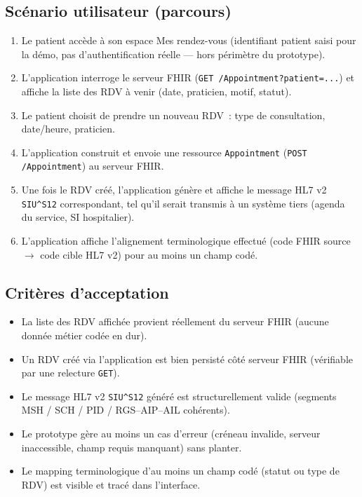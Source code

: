 \documentclass[11pt,a4paper]{article}
\newcommand{\siu}{SIU\textasciicircum{}S12}
\begin{document}
\subsection{Sc\'enario utilisateur (parcours)}
\begin{enumerate}[leftmargin=1.2cm]
  \item Le patient acc\`ede \`a son espace \og Mes rendez-vous \fg{} (identifiant patient saisi pour la d\'emo, pas d'authentification r\'eelle --- hors p\'erim\`etre du prototype).
  \item L'application interroge le serveur FHIR (\texttt{GET /Appointment?patient=...}) et affiche la liste des RDV \`a venir (date, praticien, motif, statut).
  \item Le patient choisit de prendre un nouveau RDV~: type de consultation, date/heure, praticien.
  \item L'application construit et envoie une ressource \texttt{Appointment} (\texttt{POST /Appointment}) au serveur FHIR.
  \item Une fois le RDV cr\'e\'e, l'application g\'en\`ere et affiche le message HL7 v2 \texttt{\siu} correspondant, tel qu'il serait transmis \`a un syst\`eme tiers (agenda du service, SI hospitalier).
  \item L'application affiche l'alignement terminologique effectu\'e (code FHIR source $\rightarrow$ code cible HL7 v2) pour au moins un champ cod\'e.
\end{enumerate}

\subsection{Crit\`eres d'acceptation}
\begin{itemize}[leftmargin=1.2cm]
  \item La liste des RDV affich\'ee provient r\'eellement du serveur FHIR (aucune donn\'ee m\'etier cod\'ee en dur).
  \item Un RDV cr\'e\'e via l'application est bien persist\'e c\^ot\'e serveur FHIR (v\'erifiable par une relecture \texttt{GET}).
  \item Le message HL7 v2 \texttt{\siu} g\'en\'er\'e est structurellement valide (segments MSH / SCH / PID / RGS--AIP--AIL coh\'erents).
  \item Le prototype g\`ere au moins un cas d'erreur (cr\'eneau invalide, serveur inaccessible, champ requis manquant) sans planter.
  \item Le mapping terminologique d'au moins un champ cod\'e (statut ou type de RDV) est visible et trac\'e dans l'interface.
\end{itemize}
\end{document}
